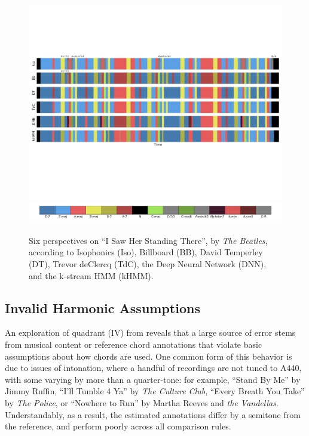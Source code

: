 \documentclass{article}
\begin{document}
\begin{figure}[t!]
\centering
\includegraphics[width=\textwidth]{TROSSUK149E3AE03BD_annotations_mkup2}
\includegraphics[width=\textwidth]{TROSSUK149E3AE03BD_legend}
\caption{Six perspectives on ``I Saw Her Standing There'', by \emph{The Beatles}, according to Isophonics (Iso), Billboard (BB), David Temperley (DT), Trevor deClercq (TdC), the Deep Neural Network (DNN), and the k-stream HMM (kHMM).}
\label{fig:beatles}
\end{figure}


\subsection{Invalid Harmonic Assumptions}
\label{subsec:validity}

An exploration of quadrant (IV) from  reveals that a large source of error stems from musical content or reference chord annotations that violate basic assumptions about how chords are used.
One common form of this behavior is due to issues of intonation, where a handful of recordings are not tuned to A440, with some varying by more than a quarter-tone:
for example, ``Stand By Me'' by Jimmy Ruffin, ``I'll Tumble 4 Ya'' by \emph{The Culture Club}, ``Every Breath You Take'' by \emph{The Police}, or ``Nowhere to Run'' by Martha Reeves and \emph{the Vandellas}.
Understandably, as a result, the estimated annotations differ by a semitone from the reference, and perform poorly across all comparison rules.
\end{document}
